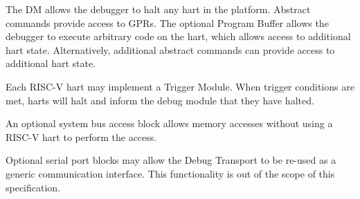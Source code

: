 The DM allows the debugger to halt any hart in the platform. Abstract commands
provide access to GPRs.
The optional Program Buffer allows the debugger to execute arbitrary code on the hart,
which allows access to additional hart state. Alternatively, additional
abstract commands can provide access to additional hart state.

Each RISC-V hart may implement a Trigger Module. When trigger conditions
are met, harts will halt and inform the debug module that they have
halted.

An optional system bus access block allows memory accesses without using a
RISC-V hart to perform the access.

Optional serial port blocks may allow the Debug Transport to be re-used as a
generic communication interface. This functionality is out of the
scope of this specification.

